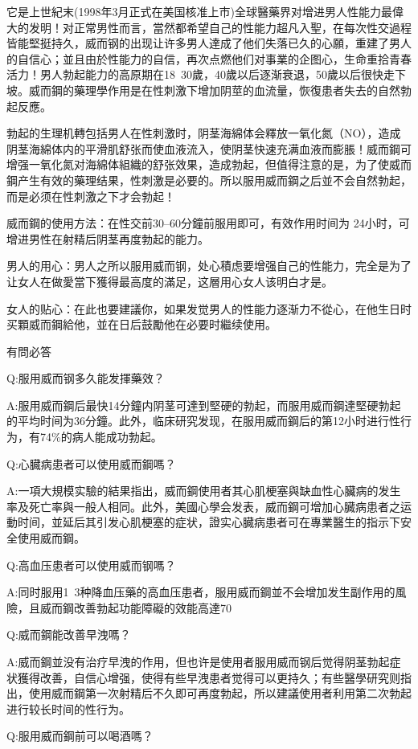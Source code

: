 \documentclass[12pt,UTF8]{ctexbook}
\begin{document}
它是上世紀末(1998年3月正式在美国核准上市)全球醫藥界对增进男人性能力最偉大的发明！对正常男性而言，當然都希望自己的性能力超凡入聖，在每次性交過程皆能堅挺持久，威而钢的出现让许多男人達成了他们失落已久的心願，重建了男人的自信心；並且由於性能力的自信，再次点燃他们对事業的企图心，生命重拾青春活力！男人勃起能力的高原期在18~30歲，40歲以后逐渐衰退，50歲以后很快走下坡。威而鋼的藥理學作用是在性刺激下增加阴莖的血流量，恢復患者失去的自然勃起反應。

勃起的生理机轉包括男人在性刺激时，阴茎海綿体会釋放一氧化氮（NO），造成阴茎海綿体内的平滑肌舒张而使血液流入，使阴茎快速充满血液而膨脹！威而鋼可增强一氧化氮对海綿体組織的舒张效果，造成勃起，但值得注意的是，为了使威而鋼产生有效的藥理结果，性刺激是必要的。所以服用威而鋼之后並不会自然勃起，而是必须在性刺激之下才会勃起！

威而鋼的使用方法：在性交前30--60分鐘前服用即可，有效作用时间为
24小时，可增进男性在射精后阴茎再度勃起的能力。

男人的用心：男人之所以服用威而钢，处心積虑要增强自己的性能力，完全是为了让女人在做愛當下獲得最高度的滿足，这層用心女人该明白才是。

女人的贴心：在此也要建議你，如果发觉男人的性能力逐渐力不從心，在他生日时买顆威而鋼給他，並在日后鼓勵他在必要时繼续使用。

有問必答

Q:服用威而钢多久能发揮藥效？

A:服用威而鋼后最快14分鐘内阴茎可達到堅硬的勃起，而服用威而鋼達堅硬勃起的平均时间为36分鐘。此外，临床研究发现，在服用威而鋼后的第12小时进行性行为，有74\%的病人能成功勃起。

Q:心臓病患者可以使用威而鋼嗎？

A:一項大規模实驗的結果指出，威而鋼使用者其心肌梗塞與缺血性心臟病的发生率及死亡率與一般人相同。此外，美國心學会发表，威而鋼可增加心臓病患者之运動时间，並延后其引发心肌梗塞的症状，證实心臓病患者可在專業醫生的指示下安全使用威而鋼。

Q:高血压患者可以使用威而钢嗎？

A:同时服用1~3种降血压藥的高血压患者，服用威而鋼並不会增加发生副作用的風險，且威而鋼改善勃起功能障礙的效能高達70%

Q:威而鋼能改善早洩嗎？

A:威而鋼並没有治疗早洩的作用，但也许是使用者服用威而钢后觉得阴茎勃起症状獲得改善，自信心增强，使得有些早洩患者觉得可以更持久；有些醫學研究则指出，使用威而鋼第一次射精后不久即可再度勃起，所以建議使用者利用第二次勃起进行较长时间的性行为。

Q:服用威而鋼前可以喝酒嗎？
\end{document}
